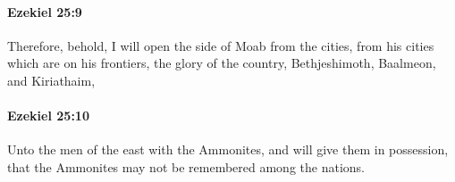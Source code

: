 		\paragraph{Ezekiel 25:9} %
			\label{EZEKIEL-25-9}

			Therefore, behold, I will open the side of Moab from the cities, from his cities which are on his frontiers, the glory of the country, Bethjeshimoth, Baalmeon, and Kiriathaim,


		\paragraph{Ezekiel 25:10} %
			\label{EZEKIEL-25-10}

			Unto the men of the east with the Ammonites, and will give them in possession, that the Ammonites may not be remembered among the nations.


